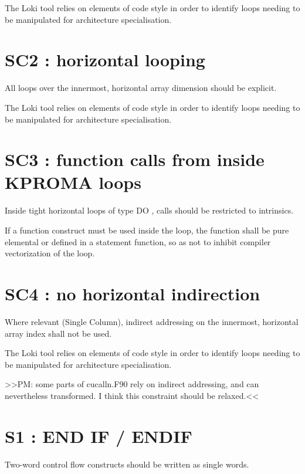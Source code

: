 \documentclass[letterpaper,10pt,english]{sphinxmanual}
\begin{document}
The Loki tool relies on elements of code style in order to identify loops needing to be manipulated
for architecture specialisation.


\section{SC2 : horizontal looping}
\label{\detokenize{rules/SC2:sc2-horizontal-looping}}\label{\detokenize{rules/SC2::doc}}
All loops over the innermost, horizontal array dimension should be explicit.

The Loki tool relies on elements of code style in order to identify loops needing to be manipulated
for architecture specialisation.


\section{SC3 : function calls from inside KPROMA loops}
\label{\detokenize{rules/SC3:sc3-function-calls-from-inside-kproma-loops}}\label{\detokenize{rules/SC3::doc}}
Inside tight horizontal loops of type DO , calls should be restricted to intrinsics.

If a function construct must be used inside the loop, the function shall be pure elemental or defined in a statement function, so as not
to inhibit compiler vectorization of the loop.


\section{SC4 : no horizontal indirection}
\label{\detokenize{rules/SC4:sc4-no-horizontal-indirection}}\label{\detokenize{rules/SC4::doc}}
Where relevant (Single Column), indirect addressing on the innermost,
horizontal array index shall not be used.

The Loki tool relies on elements of code style in order to identify loops needing to be manipulated
for architecture specialisation.

\textgreater{}\textgreater{}PM: some parts of cucalln.F90 rely on indirect addressing, and can nevertheless transformed. I think
this constraint should be relaxed.\textless{}\textless{}


\section{S1 : END IF / ENDIF}
\label{\detokenize{rules/S1:s1-end-if-endif}}\label{\detokenize{rules/S1::doc}}
Two-word control flow constructs should be written as single words.
\end{document}
